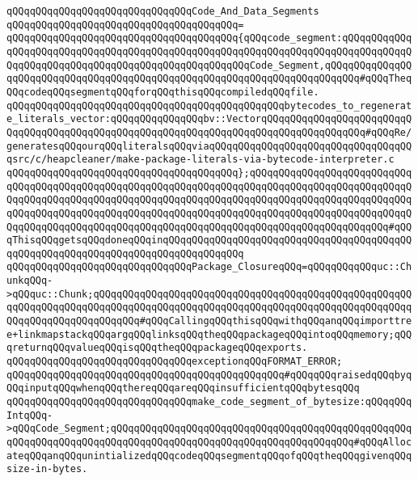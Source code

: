 \verb|qQQqqQQqqQQqqQQqqQQqqQQqqQQqqQQqCode_And_Data_Segments|\newline
\verb|qQQqqQQqqQQqqQQqqQQqqQQqqQQqqQQqqQQqqQQq=|\newline
\verb|qQQqqQQqqQQqqQQqqQQqqQQqqQQqqQQqqQQqqQQq{qQQqcode_segment:qQQqqQQqqQQqqQQqqQQqqQQqqQQqqQQqqQQqqQQqqQQqqQQqqQQqqQQqqQQqqQQqqQQqqQQqqQQqqQQqqQQqqQQqqQQqqQQqqQQqqQQqqQQqqQQqqQQqqQQqqQQqCode_Segment,qQQqqQQqqQQqqQQqqQQqqQQqqQQqqQQqqQQqqQQqqQQqqQQqqQQqqQQqqQQqqQQqqQQqqQQqqQQq#qQQqTheqQQqcodeqQQqsegmentqQQqforqQQqthisqQQqcompiledqQQqfile.|\newline
\verb|qQQqqQQqqQQqqQQqqQQqqQQqqQQqqQQqqQQqqQQqqQQqqQQqbytecodes_to_regenerate_literals_vector:qQQqqQQqqQQqqQQqbv::VectorqQQqqQQqqQQqqQQqqQQqqQQqqQQqqQQqqQQqqQQqqQQqqQQqqQQqqQQqqQQqqQQqqQQqqQQqqQQqqQQqqQQqqQQq#qQQqRe/generatesqQQqourqQQqliteralsqQQqviaqQQqqQQqqQQqqQQqqQQqqQQqqQQqqQQqqQQqsrc/c/heapcleaner/make-package-literals-via-bytecode-interpreter.c|\newline
\verb|qQQqqQQqqQQqqQQqqQQqqQQqqQQqqQQqqQQqqQQq};qQQqqQQqqQQqqQQqqQQqqQQqqQQqqQQqqQQqqQQqqQQqqQQqqQQqqQQqqQQqqQQqqQQqqQQqqQQqqQQqqQQqqQQqqQQqqQQqqQQqqQQqqQQqqQQqqQQqqQQqqQQqqQQqqQQqqQQqqQQqqQQqqQQqqQQqqQQqqQQqqQQqqQQqqQQqqQQqqQQqqQQqqQQqqQQqqQQqqQQqqQQqqQQqqQQqqQQqqQQqqQQqqQQqqQQqqQQqqQQqqQQqqQQqqQQqqQQqqQQqqQQqqQQqqQQqqQQqqQQqqQQqqQQqqQQqqQQqqQQqqQQq#qQQqThisqQQqgetsqQQqdoneqQQqinqQQqqQQqqQQqqQQqqQQqqQQqqQQqqQQqqQQqqQQqqQQqqQQqqQQqqQQqqQQqqQQqqQQqqQQqqQQqqQQqqQQq|\newline
\newline
\verb|qQQqqQQqqQQqqQQqqQQqqQQqqQQqqQQqPackage_ClosureqQQq=qQQqqQQqqQQquc::ChunkqQQq->qQQquc::Chunk;qQQqqQQqqQQqqQQqqQQqqQQqqQQqqQQqqQQqqQQqqQQqqQQqqQQqqQQqqQQqqQQqqQQqqQQqqQQqqQQqqQQqqQQqqQQqqQQqqQQqqQQqqQQqqQQqqQQqqQQqqQQqqQQqqQQqqQQqqQQqqQQqqQQq#qQQqCallingqQQqthisqQQqwithqQQqanqQQqimporttree+linkmapstackqQQqargqQQqlinksqQQqtheqQQqpackageqQQqintoqQQqmemory;qQQqreturnqQQqvalueqQQqisqQQqtheqQQqpackageqQQqexports.|\newline
\newline
\verb|qQQqqQQqqQQqqQQqqQQqqQQqqQQqqQQqexceptionqQQqFORMAT_ERROR;|\newline
\verb|qQQqqQQqqQQqqQQqqQQqqQQqqQQqqQQqqQQqqQQqqQQqqQQq#qQQqqQQqraisedqQQqbyqQQqinputqQQqwhenqQQqthereqQQqareqQQqinsufficientqQQqbytesqQQq|\newline
\newline
\verb|qQQqqQQqqQQqqQQqqQQqqQQqqQQqqQQqmake_code_segment_of_bytesize:qQQqqQQqIntqQQq->qQQqCode_Segment;qQQqqQQqqQQqqQQqqQQqqQQqqQQqqQQqqQQqqQQqqQQqqQQqqQQqqQQqqQQqqQQqqQQqqQQqqQQqqQQqqQQqqQQqqQQqqQQqqQQqqQQqqQQqqQQq#qQQqAllocateqQQqanqQQqunintializedqQQqcodeqQQqsegmentqQQqofqQQqtheqQQqgivenqQQqsize-in-bytes.|\newline
